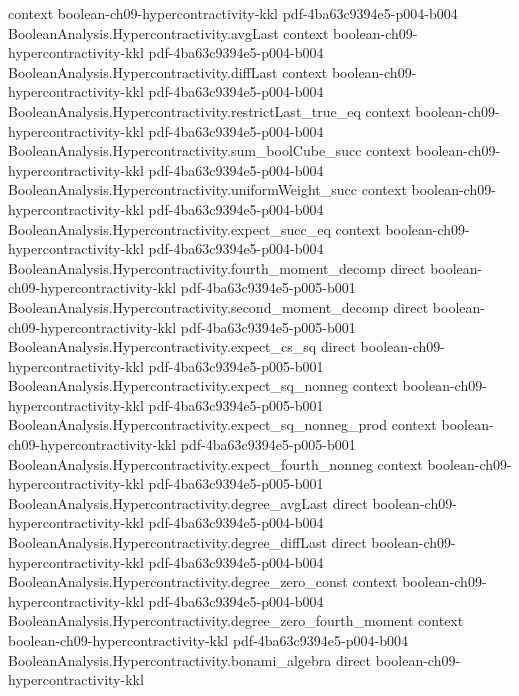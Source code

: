 \begin{lemma}
  {context}
  {boolean-ch09-hypercontractivity-kkl}
  {pdf-4ba63c9394e5-p004-b004}
\proofstep
  {BooleanAnalysis.Hypercontractivity.avgLast}
  {context}
  {boolean-ch09-hypercontractivity-kkl}
  {pdf-4ba63c9394e5-p004-b004}
\proofstep
  {BooleanAnalysis.Hypercontractivity.diffLast}
  {context}
  {boolean-ch09-hypercontractivity-kkl}
  {pdf-4ba63c9394e5-p004-b004}
\proofstep
  {BooleanAnalysis.Hypercontractivity.restrictLast_true_eq}
  {context}
  {boolean-ch09-hypercontractivity-kkl}
  {pdf-4ba63c9394e5-p004-b004}
\proofstep
  {BooleanAnalysis.Hypercontractivity.sum_boolCube_succ}
  {context}
  {boolean-ch09-hypercontractivity-kkl}
  {pdf-4ba63c9394e5-p004-b004}
\proofstep
  {BooleanAnalysis.Hypercontractivity.uniformWeight_succ}
  {context}
  {boolean-ch09-hypercontractivity-kkl}
  {pdf-4ba63c9394e5-p004-b004}
\proofstep
  {BooleanAnalysis.Hypercontractivity.expect_succ_eq}
  {context}
  {boolean-ch09-hypercontractivity-kkl}
  {pdf-4ba63c9394e5-p004-b004}
\proofstep
  {BooleanAnalysis.Hypercontractivity.fourth_moment_decomp}
  {direct}
  {boolean-ch09-hypercontractivity-kkl}
  {pdf-4ba63c9394e5-p005-b001}
\proofstep
  {BooleanAnalysis.Hypercontractivity.second_moment_decomp}
  {direct}
  {boolean-ch09-hypercontractivity-kkl}
  {pdf-4ba63c9394e5-p005-b001}
\proofstep
  {BooleanAnalysis.Hypercontractivity.expect_cs_sq}
  {direct}
  {boolean-ch09-hypercontractivity-kkl}
  {pdf-4ba63c9394e5-p005-b001}
\proofstep
  {BooleanAnalysis.Hypercontractivity.expect_sq_nonneg}
  {context}
  {boolean-ch09-hypercontractivity-kkl}
  {pdf-4ba63c9394e5-p005-b001}
\proofstep
  {BooleanAnalysis.Hypercontractivity.expect_sq_nonneg_prod}
  {context}
  {boolean-ch09-hypercontractivity-kkl}
  {pdf-4ba63c9394e5-p005-b001}
\proofstep
  {BooleanAnalysis.Hypercontractivity.expect_fourth_nonneg}
  {context}
  {boolean-ch09-hypercontractivity-kkl}
  {pdf-4ba63c9394e5-p005-b001}
\proofstep
  {BooleanAnalysis.Hypercontractivity.degree_avgLast}
  {direct}
  {boolean-ch09-hypercontractivity-kkl}
  {pdf-4ba63c9394e5-p004-b004}
\proofstep
  {BooleanAnalysis.Hypercontractivity.degree_diffLast}
  {direct}
  {boolean-ch09-hypercontractivity-kkl}
  {pdf-4ba63c9394e5-p004-b004}
\proofstep
  {BooleanAnalysis.Hypercontractivity.degree_zero_const}
  {context}
  {boolean-ch09-hypercontractivity-kkl}
  {pdf-4ba63c9394e5-p004-b004}
\proofstep
  {BooleanAnalysis.Hypercontractivity.degree_zero_fourth_moment}
  {context}
  {boolean-ch09-hypercontractivity-kkl}
  {pdf-4ba63c9394e5-p004-b004}
\proofstep
  {BooleanAnalysis.Hypercontractivity.bonami_algebra}
  {direct}
  {boolean-ch09-hypercontractivity-kkl}

\end{lemma}
